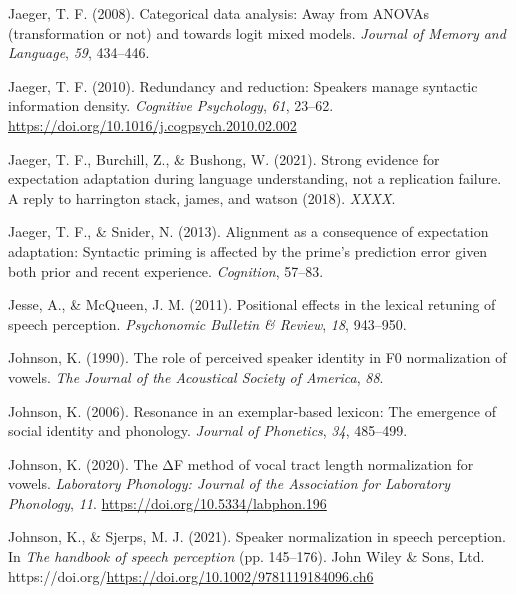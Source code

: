 \documentclass[
  11pt,
  english,
  man,floatsintext]{apa6}
\newlength{\cslhangindent}
\newlength{\cslentryspacingunit} %
\newenvironment{CSLReferences}[2] %
 {%
  \setlength{\parindent}{0pt}
  \ifodd #1
  \let\oldpar\par
  \def\par{\hangindent=\cslhangindent\oldpar}
  \fi
  \setlength{\parskip}{#2\cslentryspacingunit}
 }%
 {}
\begin{document}
\begin{CSLReferences}{1}{0}
\leavevmode{}%
Jaeger, T. F. (2008). Categorical data analysis: Away from ANOVAs (transformation or not) and towards logit mixed models. \emph{Journal of Memory and Language}, \emph{59}, 434--446.

\leavevmode{}%
Jaeger, T. F. (2010). Redundancy and reduction: Speakers manage syntactic information density. \emph{Cognitive Psychology}, \emph{61}, 23--62. \url{https://doi.org/10.1016/j.cogpsych.2010.02.002}

\leavevmode{}%
Jaeger, T. F., Burchill, Z., \& Bushong, W. (2021). Strong evidence for expectation adaptation during language understanding, not a replication failure. A reply to harrington stack, james, and watson (2018). \emph{XXXX}.

\leavevmode{}%
Jaeger, T. F., \& Snider, N. (2013). Alignment as a consequence of expectation adaptation: Syntactic priming is affected by the prime's prediction error given both prior and recent experience. \emph{Cognition}, 57--83.

\leavevmode{}%
Jesse, A., \& McQueen, J. M. (2011). Positional effects in the lexical retuning of speech perception. \emph{Psychonomic Bulletin \& Review}, \emph{18}, 943--950.

\leavevmode{}%
Johnson, K. (1990). The role of perceived speaker identity in F0 normalization of vowels. \emph{The Journal of the Acoustical Society of America}, \emph{88}.

\leavevmode{}%
Johnson, K. (2006). Resonance in an exemplar-based lexicon: The emergence of social identity and phonology. \emph{Journal of Phonetics}, \emph{34}, 485--499.

\leavevmode{}%
Johnson, K. (2020). The ΔF method of vocal tract length normalization for vowels. \emph{Laboratory Phonology: Journal of the Association for Laboratory Phonology}, \emph{11}. \url{https://doi.org/10.5334/labphon.196}

\leavevmode{}%
Johnson, K., \& Sjerps, M. J. (2021). Speaker normalization in speech perception. In \emph{The handbook of speech perception} (pp. 145--176). John Wiley \& Sons, Ltd. https://doi.org/\url{https://doi.org/10.1002/9781119184096.ch6}


\end{CSLReferences}
\end{document}
